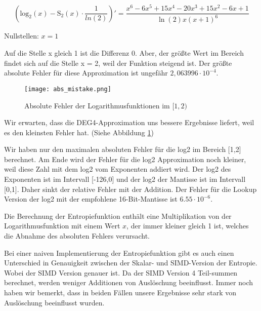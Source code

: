 \begin{equation*}
    (\mathrm{log_{2}}(x) - \mathrm{S_{2}}(x) \cdot \frac{1}{ln(2)})'
    = \dfrac{x^6-6x^5+15x^4-20x^3+15x^2-6x+1}{\ln\left(2\right)x\left(x+1\right)^6}
\end{equation*} \par

Nullstellen: $x = 1$ \par

Auf die Stelle x gleich 1 ist die Differenz 0. Aber, der größte Wert im Bereich findet sich auf die Stelle x = 2, weil der Funktion steigend ist. Der größte absolute Fehler für diese Approximation ist ungefähr $2,063996 \cdot 10^{-4}$.

\begin{figure}[h]
    \label{fig:absolute-mistake}
  \centering
  \texttt{[image: abs\_mistake.png]}
  \caption{Absolute Fehler der Logarithmusfunktionen im $[1,2)$}
\end{figure}

Wir erwarten, dass die DEG4-Approximation uns bessere Ergebnisse liefert, weil es den kleinsten Fehler hat. (Siehe Abbildung \ref{fig:absolute-mistake})

Wir haben nur den maximalen absoluten Fehler für die log2 im Bereich [1,2] berechnet. Am Ende wird der Fehler für die log2 Approximation noch kleiner, weil diese Zahl mit dem log2 vom Exponenten addiert wird. Der log2 des Exponenten ist im Intervall [-126,0] und der log2 der Mantisse ist im Intervall [0,1]. Daher sinkt der relative Fehler mit der Addition. Der Fehler für die Lookup Version der log2 mit der empfohlene 16-Bit-Mantisse ist $6.55 \cdot 10^{-6}$.~\cite{fast_log}


Die Berechnung der Entropiefunktion enthält eine Multiplikation von der Logarithmusfunktion mit einem Wert $x$, der immer kleiner gleich 1 ist, welches die Abnahme des absoluten Fehlers verursacht.

Bei einer naiven Implementierung der Entropiefunktion gibt es auch einen Unterschied in Genauigkeit zwischen der Skalar- und SIMD-Version der Entropie. Wobei der SIMD Version genauer ist. Da der SIMD Version 4 Teil-summen berechnet, werden weniger Additionen von Auslöschung beeinflusst. Immer noch haben wir bemerkt, dass in beiden Fällen unsere Ergebnisse sehr stark von Auslöschung beeinflusst wurden.

